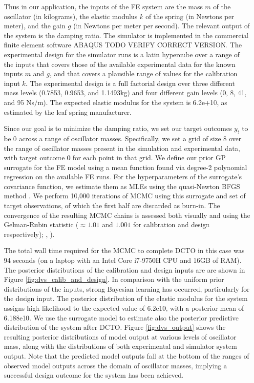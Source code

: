 \documentclass[12pt]{article}
\begin{document}
%
Thus in our application, the inputs of the FE system are the mass $m$ of the oscillator (in kilograms), the elastic modulus $k$ of the spring (in Newtons per meter), and the gain $g$ (in Newtons per meter per second).
%
The relevant output of the system is the damping ratio.
%
The simulator is implemented in the commercial finite element software ABAQUS \citep{Abaqus2012} TODO VERIFY CORRECT VERSION.
%
The experimental design for the simulator runs is a latin hypercube over a range of the inputs that covers those of the available experimental data for the known inputs $m$ and $g$, and that covers a plausible range of values for the calibration input $k$.
%
The experimental design is a full factorial design over three different mass levels (0.7853, 0.9653, and 1.1493kg) and four different gain levels (0, 8, 41, and 95 Ns/m).
%
The expected elastic modulus for the system is 6.2e+10, as estimated by the leaf spring manufacturer.
%

%
Since our goal is to minimize the damping ratio, we set our target outcomes $y_t$ to be 0 across a range of oscillator masses.
%
Specifically, we set a grid of size 8 over the range of oscillator masses present in the simulation and experimental data, with target outcome 0 for each point in that grid.
%
We define our prior GP surrogate for the FE model using a mean function found via degree-2 polynomial regression on the available FE runs.
%
For the hyperparameters of the surrogate's covariance function, we estimate them as MLEs using the quasi-Newton BFGS method \citep{Fletcher2013}.
%
We perform 10,000 iterations of MCMC using this surrogate and set of target observations, of which the first half are discarded as burn-in.
%
The convergence of the resulting MCMC chains is assessed both visually and using the Gelman-Rubin statistic ($\approx1.01$ and $1.001$ for calibration and design respectively); \citeauthor{Gelman1992a}, \citeyear{Gelman1992a}).
%

%
The total wall time required for the MCMC to complete DCTO in this case was 94 seconds (on a laptop with an Intel Core i7-9750H CPU and 16GB of RAM).
%
The posterior distributions of the calibration and design inputs are are shown in Figure \ref{fig:dvs_calib_and_design}.
%
In comparison with the uniform prior distributions of the inputs, strong Bayesian learning has occurred, particularly for the design input.
%
The posterior distribution of the elastic modulus for the system assigns high likelihood to the expected value of 6.2e10, with a posterior mean of 6.188e10.
%
We use the surrogate model to estimate also the posterior predictive distribution of the system after DCTO.
%
Figure \ref{fig:dvs_output} shows the resulting posterior distributions of model output at various levels of oscillator mass, along with the distributions of both experimental and simulator system output.
%
Note that the predicted model outputs fall at the bottom of the ranges of observed model outputs across the domain of oscillator masses, implying a successful design outcome for the system has been achieved.
%
\end{document}
